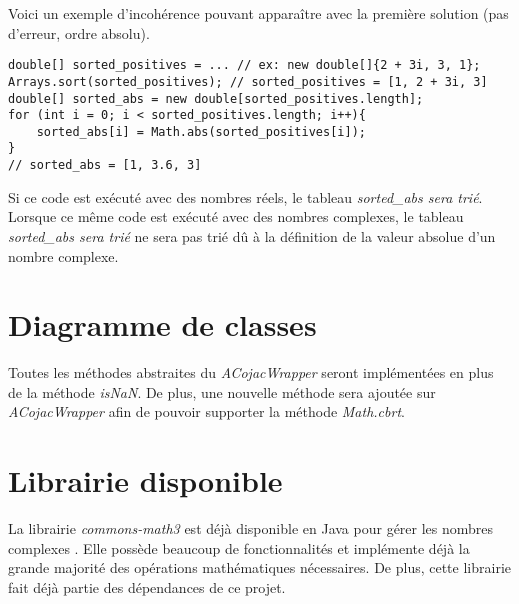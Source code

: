 \begin{minipage2}
Voici un exemple d'incohérence pouvant apparaître avec la première solution (pas d'erreur, ordre absolu).

\begin{verbatim}
double[] sorted_positives = ... // ex: new double[]{2 + 3i, 3, 1};
Arrays.sort(sorted_positives); // sorted_positives = [1, 2 + 3i, 3]
double[] sorted_abs = new double[sorted_positives.length];
for (int i = 0; i < sorted_positives.length; i++){
    sorted_abs[i] = Math.abs(sorted_positives[i]);
}
// sorted_abs = [1, 3.6, 3]
\end{verbatim}
\end{minipage2}

Si ce code est exécuté avec des nombres réels, le tableau \textit{sorted\_abs sera trié}. Lorsque ce même code est exécuté avec des nombres complexes, le tableau \textit{sorted\_abs sera trié} ne sera pas trié dû à la définition de la valeur absolue d'un nombre complexe.

\section{Diagramme de classes}

Toutes les méthodes abstraites du \textit{ACojacWrapper} seront implémentées en plus de la méthode \textit{isNaN}. De plus, une nouvelle méthode sera ajoutée sur \textit{ACojacWrapper} afin de pouvoir supporter la méthode \textit{Math.cbrt}.


\section{Librairie disponible}

La librairie \textit{commons-math3} est déjà disponible en Java pour gérer les nombres complexes \cite{apache-complex-documentation}. Elle possède beaucoup de fonctionnalités et implémente déjà la grande majorité des opérations mathématiques nécessaires. De plus, cette librairie fait déjà partie des dépendances de ce projet.